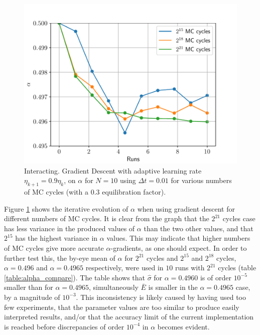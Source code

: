 \documentclass[%
oneside,                 %
final,                   %
10pt]{article}
\begin{document}
\begin{figure}[!h]
        \centering 
         \includegraphics[scale=0.6]{../Results/GD_interacting.pdf} 
        \caption{Interacting. Gradient Descent with adaptive learning rate $\eta_{k+1}= 0.9\eta_{k} $, on $\alpha$ for $N=10$ using $\Delta t=0.01$ for various numbers of MC cycles (with a $0.3$ equilibration factor).}
        \label{fig:GD_interacting}   
\end{figure}  

Figure \ref{fig:GD_interacting} shows the iterative evolution of $\alpha$ when using gradient descent for different numbers of MC cycles. It is clear from the graph that the $2^{21}$ cycles case has less variance in the produced values of $\alpha$ than the two other values, and that $2^{15}$ has the highest variance in $\alpha$ values. This may indicate that higher numbers of MC cycles give more accurate $\alpha$-gradients, as one should expect. In order to further test this, the by-eye mean of $\alpha$ for $2^{21}$ cycles and $2^{15}$ and $2^{18}$ cycles, $\alpha=0.496$ and $\alpha=0.4965$ respectively, were used in $10$ runs with $2^{21}$ cycles (table \ref{table:alpha_compare}). The table shows that $\hat \sigma$ for $\alpha=0.4960$ is of order $10^{-5}$ 
smaller than for $\alpha=0.4965$, simultaneously $\bar E$ is smaller in the $\alpha=0.4965$ case, by a magnitude of $10^{-3}$. This inconsistency is likely caused by having used too few experiments, that the parameter values are too similar to produce easily interpreted results, and/or that the accuracy limit of the current implementation is reached before discrepancies of order $10^{-4}$ in $\alpha$ becomes evident. 
\end{document}
